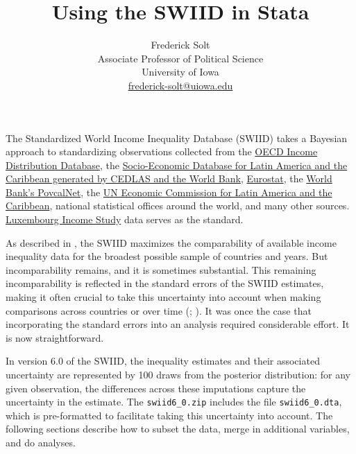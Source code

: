 \documentclass[11pt]{article}
\begin{document}
\title{Using the SWIID in Stata}
\author{
Frederick Solt\\
  Associate Professor of Political Science\\
  University of Iowa\\
  \href{mailto:frederick-solt@uiowa.edu}{frederick-solt@uiowa.edu}}
\date{}
\maketitle 

The Standardized World Income Inequality Database (SWIID) takes a Bayesian approach to standardizing observations collected from the \href{http://www.oecd.org/social/inequality.htm}{OECD Income Distribution Database}, the \href{http://sedlac.econo.unlp.edu.ar/eng/}{Socio-Economic Database for Latin America and the Caribbean generated by CEDLAS and the World Bank}, \href{http://epp.eurostat.ec.europa.eu}{Eurostat}, the \href{http://iresearch.worldbank.org/PovcalNet/index.htm}{World Bank's PovcalNet}, the \href{http://interwp.cepal.org/sisgen/ConsultaIntegrada.asp?idIndicador=250\&idioma=e}{UN Economic Commission for Latin America and the Caribbean}, national statistical offices around the world, and many other sources.  \href{http://www.lisdatacenter.org}{Luxembourg Income Study} data serves as the standard.  

As described in \citet{Solt2016}, the SWIID maximizes the comparability of available income inequality data for the broadest possible sample of countries and years.  But incomparability remains, and it is sometimes substantial.  This remaining incomparability is reflected in the standard errors of the SWIID estimates, making it often crucial to take this uncertainty into account when making comparisons across countries or over time (\citealt[238]{Solt2009}; \citealt[14]{Solt2016}).  It was once the case that incorporating the standard errors into an analysis required considerable effort.  It is now straightforward.

In version 6.0 of the SWIID, the inequality estimates and their associated uncertainty are represented by 100 draws from the posterior
distribution: for any given observation, the differences across these imputations capture the uncertainty in the estimate.  The \verb+swiid6_0.zip+ includes the file \verb+swiid6_0.dta+, which is pre-formatted to facilitate taking this uncertainty into account.  The following sections describe how to subset the data, merge in additional variables, and do analyses.
\end{document}
